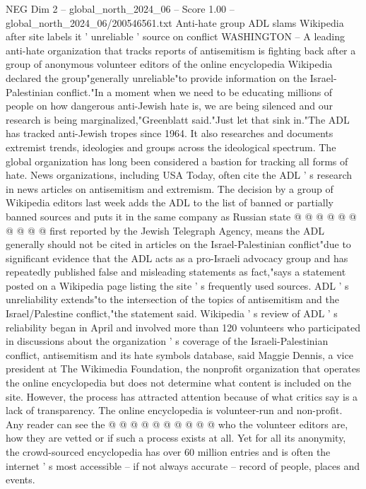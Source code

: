 \begin{textsample}{NEG Dim 2 – global\_north\_2024\_06 – Score 1.00 – global\_north\_2024\_06/200546561.txt}  \label{ex:f2_neg_192}
Anti-hate group ADL slams Wikipedia after site labels it ' unreliable ' source on conflict WASHINGTON -- A leading anti-hate organization that tracks reports of antisemitism is fighting back after a group of anonymous volunteer editors of the online encyclopedia Wikipedia declared the group"generally unreliable"to provide information on the Israel-Palestinian conflict."In a moment when we need to be educating millions of people on how dangerous anti-Jewish hate is, we are being silenced and our research is being marginalized,"Greenblatt said."Just let that sink in."The ADL has tracked anti-Jewish tropes since 1964.
It also researches and documents extremist trends, ideologies and groups across the ideological spectrum.
The global organization has long been considered a bastion for tracking all forms of hate.
News organizations, including USA Today, often cite the ADL ' s research in news articles on antisemitism and extremism.
The decision by a group of Wikipedia editors last week adds the ADL to the list of banned or partially banned sources and puts it in the same company as Russian state @ @ @ @ @ @ @ @ @ @ first reported by the Jewish Telegraph Agency, means the ADL generally should not be cited in articles on the Israel-Palestinian conflict"due to significant evidence that the ADL acts as a pro-Israeli advocacy group and has repeatedly published false and misleading statements as fact,"says a statement posted on a Wikipedia page listing the site ' s frequently used sources.
ADL ' s unreliability extends"to the intersection of the topics of antisemitism and the Israel/Palestine conflict,"the statement said.
Wikipedia ' s review of ADL ' s reliability began in April and involved more than 120 volunteers who participated in discussions about the organization ' s coverage of the Israeli-Palestinian conflict, antisemitism and its hate symbols database, said Maggie Dennis, a vice president at The Wikimedia Foundation, the nonprofit organization that operates the online encyclopedia but does not determine what content is included on the site.
However, the process has attracted attention because of what critics say is a lack of transparency.
The online encyclopedia is volunteer-run and non-profit.
Any reader can see the @ @ @ @ @ @ @ @ @ @ who the volunteer editors are, how they are vetted or if such a process exists at all.
Yet for all its anonymity, the crowd-sourced encyclopedia has over 60 million entries and is often the internet ' s most accessible -- if not always accurate -- record of people, places and events.

\end{textsample}
